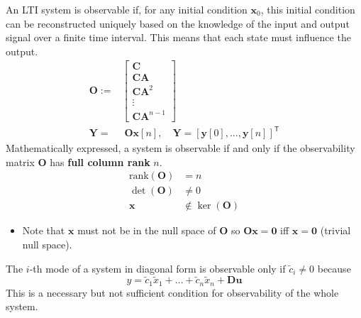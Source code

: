 An LTI system is observable if, for any initial condition $\mathbf{x}_0$, this initial condition can be reconstructed uniquely based on the knowledge of the input and output signal over a finite time interval. This means that each state must influence the output.
\noindent\begin{align*}
    \mathbf{O} := & \begin{bmatrix}
                        \mathbf{C}    \\
                        \mathbf{CA}   \\
                        \mathbf{CA}^2 \\
                        \vdots        \\
                        \mathbf{CA}^{n-1}
                    \end{bmatrix}                                                                                   \\
    \mathbf{Y} =  & \; \mathbf{Ox}[n],\quad \mathbf{Y}={\left[\mathbf{y}[0],\ldots, \mathbf{y}[n]\right]}^{\mathsf{T}}
\end{align*}
Mathematically expressed, a system is observable if and only if the observability matrix $\mathbf{O}$ has \textbf{full column rank} $n$.
\begin{align*}
    \text{rank}(\mathbf{O}) & = n                     \\
    \det(\mathbf{O})        & \neq 0                  \\
    \mathbf{x}              & \notin \ker(\mathbf{O})
\end{align*}

\newpar{}
\begin{itemize}
    \item Note that $\mathbf{x}$ must not be in the null space of $\mathbf{O}$ so $\mathbf{Ox}=\mathbf{0}$ iff $\mathbf{x}=\mathbf{0}$ (trivial null space). %
\end{itemize}


The $i$-th mode of a system in diagonal form is observable only if $\tilde{c}_i \neq 0$ because
\begin{equation*}
    y=\tilde{c}_1\tilde{x}_1+\ldots+\tilde{c}_n\tilde{x}_n+\mathbf{Du} %
\end{equation*}
This is a necessary but not sufficient condition for observability of the whole system.

